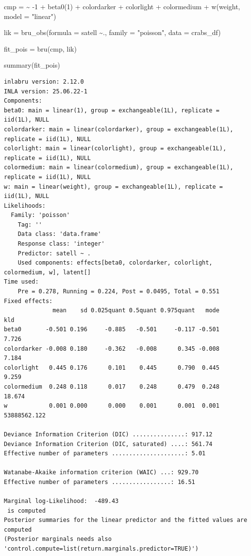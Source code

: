 \documentclass[
  letterpaper,
  DIV=11,
  numbers=noendperiod]{scrartcl}
\newenvironment{Shaded}{\begin{snugshade}}{\end{snugshade}}
\newcommand{\AttributeTok}[1]{\textcolor[rgb]{0.40,0.45,0.13}{#1}}
\newcommand{\DecValTok}[1]{\textcolor[rgb]{0.68,0.00,0.00}{#1}}
\newcommand{\ErrorTok}[1]{\textcolor[rgb]{0.68,0.00,0.00}{#1}}
\newcommand{\FunctionTok}[1]{\textcolor[rgb]{0.28,0.35,0.67}{#1}}
\newcommand{\NormalTok}[1]{\textcolor[rgb]{0.00,0.23,0.31}{#1}}
\newcommand{\OtherTok}[1]{\textcolor[rgb]{0.00,0.23,0.31}{#1}}
\newcommand{\SpecialCharTok}[1]{\textcolor[rgb]{0.37,0.37,0.37}{#1}}
\newcommand{\StringTok}[1]{\textcolor[rgb]{0.13,0.47,0.30}{#1}}
\begin{document}
\begin{Shaded}
\begin{Highlighting}[]
\NormalTok{cmp }\OtherTok{=}  \ErrorTok{\textasciitilde{}} \SpecialCharTok{{-}}\DecValTok{1} \SpecialCharTok{+} \FunctionTok{beta0}\NormalTok{(}\DecValTok{1}\NormalTok{) }\SpecialCharTok{+}\NormalTok{  colordarker }\SpecialCharTok{+}
\NormalTok{       colorlight }\SpecialCharTok{+}\NormalTok{ colormedium }\SpecialCharTok{+}
       \FunctionTok{w}\NormalTok{(weight, }\AttributeTok{model =} \StringTok{"linear"}\NormalTok{)}

\NormalTok{lik }\OtherTok{=}  \FunctionTok{bru\_obs}\NormalTok{(}\AttributeTok{formula =}\NormalTok{ satell }\SpecialCharTok{\textasciitilde{}}\NormalTok{.,}
            \AttributeTok{family =} \StringTok{"poisson"}\NormalTok{,}
            \AttributeTok{data =}\NormalTok{ crabs\_df)}

\NormalTok{fit\_pois }\OtherTok{=} \FunctionTok{bru}\NormalTok{(cmp, lik)}

\FunctionTok{summary}\NormalTok{(fit\_pois)}
\end{Highlighting}
\end{Shaded}

\begin{verbatim}
inlabru version: 2.12.0
INLA version: 25.06.22-1
Components:
beta0: main = linear(1), group = exchangeable(1L), replicate = iid(1L), NULL
colordarker: main = linear(colordarker), group = exchangeable(1L), replicate = iid(1L), NULL
colorlight: main = linear(colorlight), group = exchangeable(1L), replicate = iid(1L), NULL
colormedium: main = linear(colormedium), group = exchangeable(1L), replicate = iid(1L), NULL
w: main = linear(weight), group = exchangeable(1L), replicate = iid(1L), NULL
Likelihoods:
  Family: 'poisson'
    Tag: ''
    Data class: 'data.frame'
    Response class: 'integer'
    Predictor: satell ~ .
    Used components: effects[beta0, colordarker, colorlight, colormedium, w], latent[]
Time used:
    Pre = 0.278, Running = 0.224, Post = 0.0495, Total = 0.551 
Fixed effects:
              mean    sd 0.025quant 0.5quant 0.975quant   mode          kld
beta0       -0.501 0.196     -0.885   -0.501     -0.117 -0.501        7.726
colordarker -0.008 0.180     -0.362   -0.008      0.345 -0.008        7.184
colorlight   0.445 0.176      0.101    0.445      0.790  0.445        9.259
colormedium  0.248 0.118      0.017    0.248      0.479  0.248       18.674
w            0.001 0.000      0.000    0.001      0.001  0.001 53888562.122

Deviance Information Criterion (DIC) ...............: 917.12
Deviance Information Criterion (DIC, saturated) ....: 561.74
Effective number of parameters .....................: 5.01

Watanabe-Akaike information criterion (WAIC) ...: 929.70
Effective number of parameters .................: 16.51

Marginal log-Likelihood:  -489.43 
 is computed 
Posterior summaries for the linear predictor and the fitted values are computed
(Posterior marginals needs also 'control.compute=list(return.marginals.predictor=TRUE)')
\end{verbatim}
\end{document}
